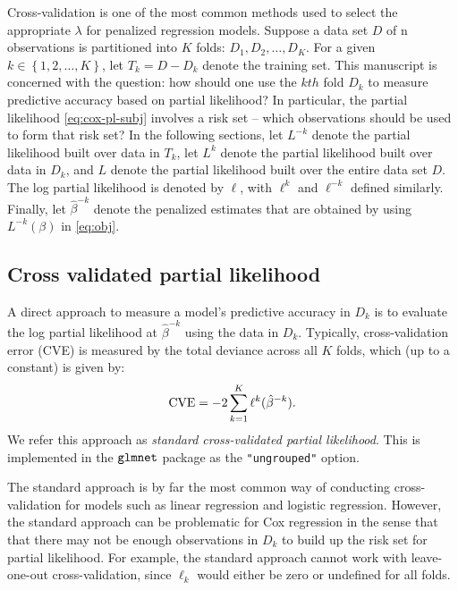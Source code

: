 \par Cross-validation is one of the most common methods used to select the appropriate $\lambda$ for penalized regression models. Suppose a data set $D$ of n observations is partitioned into $K$ folds: $D_{1}, D_{2}, \ldots, D_{K}$. For a given $k \in \left\{1,2,\ldots, K\right\}$, let $T_{k} = D - D_{k}$ denote the training set. This manuscript is concerned with the question: how should one use the $kth$ fold $D_{k}$ to measure predictive accuracy based on partial likelihood? In particular, the partial likelihood \eqref{eq:cox-pl-subj} involves a risk set -- which observations should be used to form that risk set?  In the following sections, let $L^{-k}$ denote the partial likelihood built over data in $T_k$, let $L^{k}$ denote the partial likelihood built over data in $D_k$, and $L$ denote the partial likelihood built over the entire data set $D$.  The log partial likelihood is denoted by $\ell$, with $\ell^k$ and $\ell^{-k}$ defined similarly. Finally, let $\hat{\beta}^{-k}$ denote the penalized estimates that are obtained by using $L^{-k}(\beta)$ in \eqref{eq:obj}.

\subsection{Cross validated partial likelihood} 
\label{Sec:cox-cv-existing}

\par A direct approach to measure a model's predictive accuracy in $D_k$ is to evaluate the log partial likelihood at $\hat{\beta}^{-k}$ using the data in $D_k$. Typically, cross-validation error (CVE) is measured by the total deviance across all $K$ folds, which (up to a constant) is given by:
\begin{equation}
  \label{eq:standard}
  \textrm{CVE} = -2 \sum_{k=1}^{K} \ell^{k}(\hat{\beta}^{-k}).
\end{equation}
We refer this approach as \emph{standard cross-validated partial likelihood}. This is implemented in the $\tt{glmnet}$ package as the \verb|"ungrouped"| option. %

\par The standard approach is by far the most common way of conducting cross-validation for models such as linear regression and logistic regression. However, the standard approach can be problematic for Cox regression in the sense that that there may not be enough observations in $D_k$ to build up the risk set for partial likelihood. For example, the standard approach cannot work with leave-one-out cross-validation, since $\ell_k$ would either be zero or undefined for all folds.

